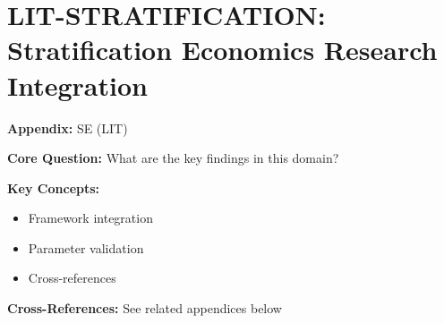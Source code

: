 

\chapter{LIT-STRATIFICATION: Stratification Economics Research Integration}
\label{app:lit-stratification}


\begin{tcolorbox}[colback=blue!5!white, colframe=blue!75!black,
    title=Quick Reference: Appendix SE]

\textbf{Appendix:} SE (LIT)

\textbf{Core Question:} What are the key findings in this domain?

\textbf{Key Concepts:}
\begin{itemize}[nosep]
\item Framework integration
\item Parameter validation
\item Cross-references
\end{itemize}

\textbf{Cross-References:} See related appendices below
\end{tcolorbox}

